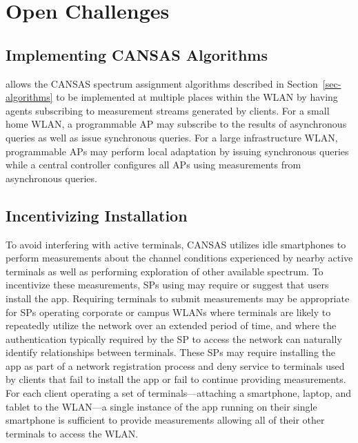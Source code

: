 \section{Open Challenges}
\label{sec-challenges}

\subsection{Implementing CANSAS Algorithms}

\PS{} allows the CANSAS spectrum assignment algorithms described in
Section~\ref{sec-algorithms} to be implemented at multiple places within the
WLAN by having agents subscribing to measurement streams generated by \PS{}
clients. For a small home WLAN, a programmable AP may subscribe to the results
of asynchronous queries as well as issue synchronous queries.  For a large
infrastructure WLAN, programmable APs may perform local adaptation by issuing
synchronous queries while a central controller configures all APs using
measurements from asynchronous queries.


\subsection{Incentivizing Installation}

To avoid interfering with active terminals, CANSAS utilizes idle smartphones
to perform measurements about the channel conditions experienced by nearby
active terminals as well as performing exploration of other available
spectrum. To incentivize these measurements, SPs using \PS{} may
require or suggest that users install the \PS{} app. Requiring
terminals to submit measurements may be appropriate for SPs operating
corporate or campus WLANs where terminals are likely to repeatedly utilize
the network over an extended period of time, and where the authentication
typically required by the SP to access the network can naturally identify
relationships between terminals. These SPs may require installing the
\PS{} app as part of a network registration process and deny service
to terminals used by clients that fail to install the app or fail to continue
providing measurements. For each client operating a set of
terminals---attaching a smartphone, laptop, and tablet to the \PS{}
WLAN---a single instance of the \PS{} app running on their single
smartphone is sufficient to provide measurements allowing all of their other
terminals to access the WLAN.

